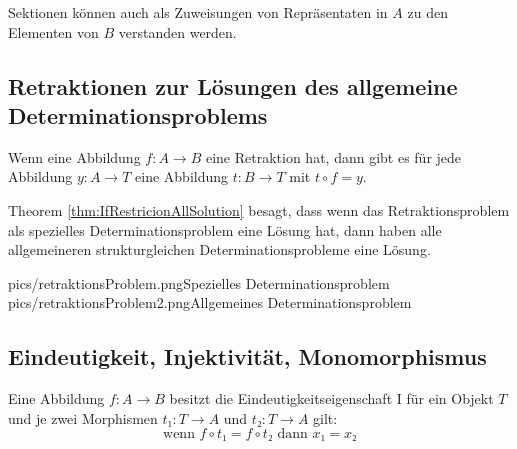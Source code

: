 \documentclass[parskip=half]{scrreprt}
\begin{document}
\begin{remark}
Sektionen können auch als Zuweisungen von Repräsentaten in $A$ zu den Elementen
von $B$ verstanden werden.

\end{remark}

\newpage
\subsection{Retraktionen zur Lösungen des allgemeine Determinationsproblems}

\begin{theorem}\label{thm:IfRestrictionDeterminationSolution}
Wenn eine Abbildung $f: A → B$ eine Retraktion hat,
dann gibt es für jede Abbildung $y: A → T$ eine Abbildung $t: B → T$ mit 
$t ∘ f = y$.
\end{theorem}

\begin{remark}
Theorem \ref{thm:IfRestricionAllSolution} besagt, dass wenn das Retraktionsproblem
als spezielles Determinationsproblem eine Lösung hat, dann haben alle 
allgemeineren strukturgleichen Determinationsprobleme eine Lösung.

\doublegraphics%
	{pics/retraktionsProblem.png}{Spezielles Determinationsproblem}%
	{pics/retraktionsProblem2.png}{Allgemeines Determinationsproblem}
\end{remark}

\newpage
\subsection{Eindeutigkeit, Injektivität, Monomorphismus}

\begin{definition}[Eindeutigkeitseigenschaft I]
Eine Abbildung $f: A → B$ besitzt die Eindeutigkeitseigenschaft I für ein 
Objekt $T$ und je zwei Morphismen $t₁: T → A$ und $t₂: T → A$ gilt:
$$\text{wenn\ } f ∘ t₁ = f ∘ t₂ \text{\ dann\ } x₁ = x₂$$

\end{definition}
\end{document}
